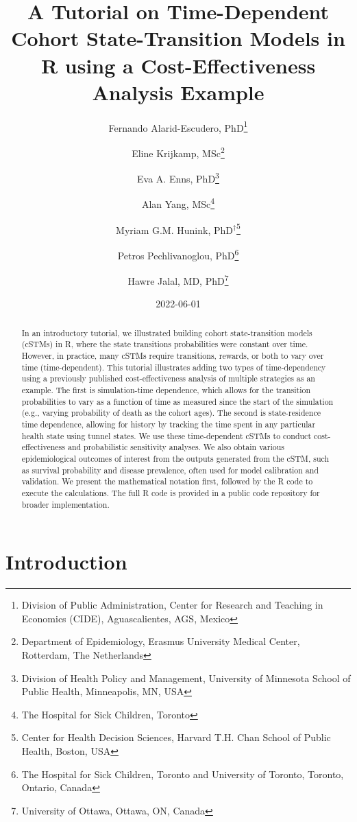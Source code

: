 \documentclass[
]{article}
\title{A Tutorial on Time-Dependent Cohort State-Transition Models in R using a Cost-Effectiveness Analysis Example}
\author{Fernando Alarid-Escudero, PhD\footnote{Division of Public Administration, Center for Research and Teaching in Economics (CIDE), Aguascalientes, AGS, Mexico} \and Eline Krijkamp, MSc\footnote{Department of Epidemiology, Erasmus University Medical Center, Rotterdam, The Netherlands} \and Eva A. Enns, PhD\footnote{Division of Health Policy and Management, University of Minnesota School of Public Health, Minneapolis, MN, USA} \and Alan Yang, MSc\footnote{The Hospital for Sick Children, Toronto} \and Myriam G.M. Hunink, PhD\(^\dagger\)\footnote{Center for Health Decision Sciences, Harvard T.H. Chan School of Public Health, Boston, USA} \and Petros Pechlivanoglou, PhD\footnote{The Hospital for Sick Children, Toronto and University of Toronto, Toronto, Ontario, Canada} \and Hawre Jalal, MD, PhD\footnote{University of Ottawa, Ottawa, ON, Canada}}
\date{2022-06-01}
\begin{document}
\maketitle
\begin{abstract}
In an introductory tutorial, we illustrated building cohort state-transition models (cSTMs) in R, where the state transitions probabilities were constant over time. However, in practice, many cSTMs require transitions, rewards, or both to vary over time (time-dependent). This tutorial illustrates adding two types of time-dependency using a previously published cost-effectiveness analysis of multiple strategies as an example. The first is simulation-time dependence, which allows for the transition probabilities to vary as a function of time as measured since the start of the simulation (e.g., varying probability of death as the cohort ages). The second is state-residence time dependence, allowing for history by tracking the time spent in any particular health state using tunnel states. We use these time-dependent cSTMs to conduct cost-effectiveness and probabilistic sensitivity analyses. We also obtain various epidemiological outcomes of interest from the outputs generated from the cSTM, such as survival probability and disease prevalence, often used for model calibration and validation. We present the mathematical notation first, followed by the R code to execute the calculations. The full R code is provided in a public code repository for broader implementation.
\end{abstract}

{
\setcounter{tocdepth}{2}
\tableofcontents
}
\hypertarget{introduction}{%
\section{Introduction}\label{introduction}}
\end{document}

